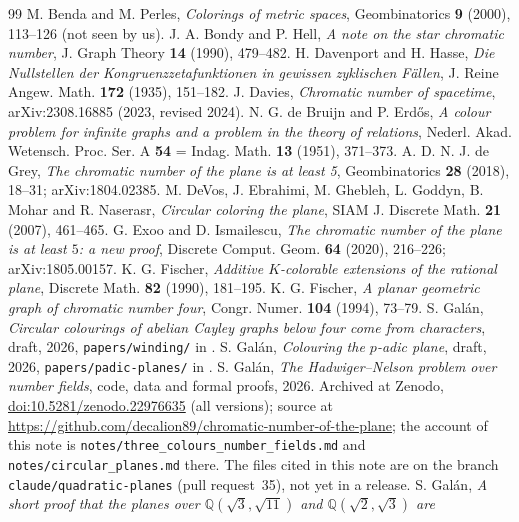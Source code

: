 \documentclass[11pt,a4paper]{amsart}
\theoremstyle{remark}
\newcommand{\Q}{\mathbb{Q}}
\begin{document}
\begin{thebibliography}{99}
 M. Benda and M. Perles, \emph{Colorings of metric spaces}, Geombinatorics \textbf{9} (2000),
113--126 (not seen by us).
 J. A. Bondy and P. Hell, \emph{A note on the star chromatic number}, J. Graph Theory \textbf{14}
(1990), 479--482.
 H. Davenport and H. Hasse, \emph{Die Nullstellen der Kongruenzzetafunktionen in gewissen zyklischen
F\"allen}, J. Reine Angew. Math. \textbf{172} (1935), 151--182.
 J. Davies, \emph{Chromatic number of spacetime}, arXiv:2308.16885 (2023, revised 2024).
 N. G. de Bruijn and P. Erd\H{o}s, \emph{A colour problem for infinite graphs and a problem in the
theory of relations}, Nederl. Akad. Wetensch. Proc. Ser. A \textbf{54} = Indag. Math. \textbf{13} (1951),
371--373.
 A. D. N. J. de Grey, \emph{The chromatic number of the plane is at least 5}, Geombinatorics
\textbf{28} (2018), 18--31; arXiv:1804.02385.
 M. DeVos, J. Ebrahimi, M. Ghebleh, L. Goddyn, B. Mohar and R. Naserasr, \emph{Circular coloring the
plane}, SIAM J. Discrete Math. \textbf{21} (2007), 461--465.
 G. Exoo and D. Ismailescu, \emph{The chromatic number of the plane is at least $5$: a new proof},
Discrete Comput. Geom. \textbf{64} (2020), 216--226; arXiv:1805.00157.
 K. G. Fischer, \emph{Additive $K$-colorable extensions of the rational plane}, Discrete
Math. \textbf{82} (1990), 181--195.
 K. G. Fischer, \emph{A planar geometric graph of chromatic number four}, Congr. Numer.
\textbf{104} (1994), 73--79.
 S. Gal\'an, \emph{Circular colourings of abelian Cayley graphs below four come from
characters}, draft, 2026, \texttt{papers/winding/} in \cite{Repo}.
 S. Gal\'an, \emph{Colouring the $p$-adic plane}, draft, 2026, \texttt{papers/padic-planes/} in
\cite{Repo}.
 S. Gal\'an, \emph{The Hadwiger--Nelson problem over number fields}, code, data and formal
proofs, 2026. Archived at Zenodo, \href{https://doi.org/10.5281/zenodo.22976635}{doi:10.5281/zenodo.22976635}
(all versions); source at \url{https://github.com/decalion89/chromatic-number-of-the-plane}; the account of this
note is \texttt{notes/three\_colours\_number\_fields.md} and \texttt{notes/circular\_planes.md} there. The files
cited in this note are on the branch \texttt{claude/quadratic-planes} (pull request~35), not yet in a release.
 S. Gal\'an, \emph{A short proof that the planes over $\Q(\sqrt3,\sqrt{11})$ and $\Q(\sqrt2,\sqrt3)$ are
}
\end{thebibliography}
\end{document}
